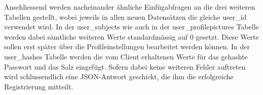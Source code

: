 \documentclass[a4paper,11pt]{report}
\begin{document}
					Anschliessend werden nacheinander ähnliche Einfügabfragen an die drei weiteren Tabellen gestellt, wobei jeweils in allen neuen Datensätzen die gleiche user\_id verwendet wird. In der user\_subjects wie auch in der user\_profilepictures Tabelle werden dabei sämtliche weiteren Werte standardmässig auf 0 gesetzt. Diese Werte sollen erst später über die Profileinstellungen bearbeitet werden können. In der user\_hashes Tabelle werden die vom Client erhaltenen Werte für das gehashte Passwort und das Salz eingefügt. Sofern dabei keine weiteren Fehler auftreten wird schlussendlich eine JSON-Antwort geschickt, die ihm die erfolgreiche Registrierung mitteilt.
		
					
					
\end{document}
